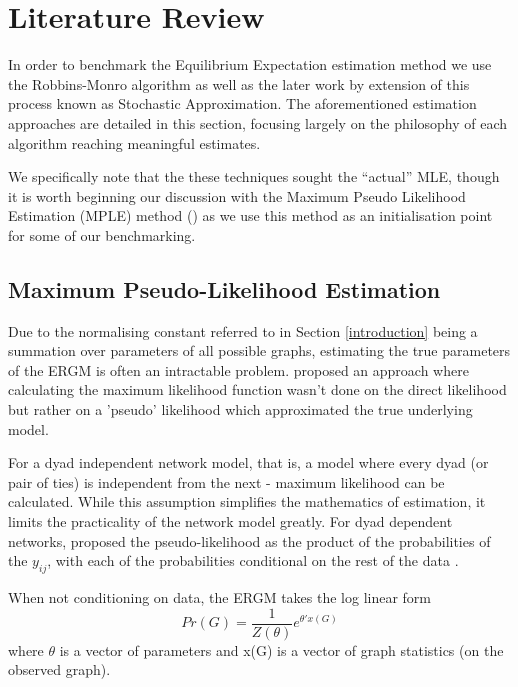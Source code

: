 \section{Literature Review}
\label{literature_review}

In order to benchmark the Equilibrium Expectation estimation method we use the Robbins-Monro algorithm as well as the later work by extension of this process known as Stochastic Approximation. The aforementioned estimation approaches are detailed in this section, focusing largely on the philosophy of each algorithm reaching meaningful estimates.

We specifically note that the these techniques sought the ``actual'' MLE, though it is worth beginning our discussion with the Maximum Pseudo Likelihood Estimation (MPLE) method (\cite{straussikeda1990}) as we use this method as an initialisation point for some of our benchmarking.

\subsection{Maximum Pseudo-Likelihood Estimation}


Due to the normalising constant referred to in Section \ref{introduction} being a summation over parameters of all possible graphs, estimating the true parameters of the ERGM is often an intractable problem. \citeauthor{straussikeda1990} proposed an approach where calculating the maximum likelihood function wasn't done on the direct likelihood but rather on a 'pseudo' likelihood which approximated the true underlying model.

For a dyad independent network model, that is, a model where every dyad (or pair of ties) is independent from the next - maximum likelihood can be calculated. While this assumption simplifies the mathematics of estimation, it limits the practicality of the network model greatly. For dyad dependent networks, \citeauthor{straussikeda1990} proposed the pseudo-likelihood as the product of the probabilities of the $y_{ij}$, with each of the probabilities conditional on the rest of the data \citet{straussikeda1990}.

When not conditioning on data, the ERGM takes the log linear form
\begin{equation}
\label{eqn:ergm_general_form}
    Pr(G) = {\frac{1}{Z(\theta)}}e^{\theta'x(G)}
\end{equation}
where $\theta$ is a vector of parameters and x(G) is a vector of graph statistics (on the observed graph).

